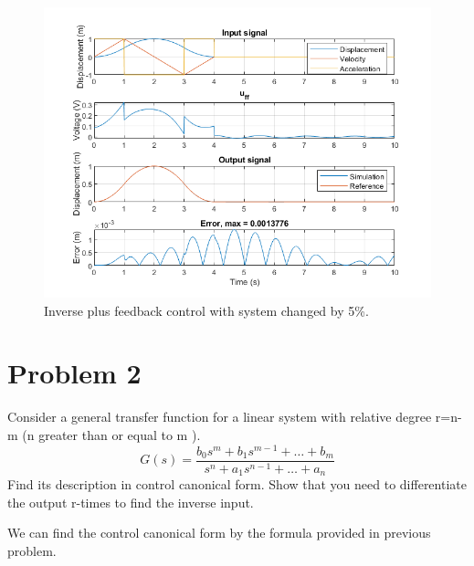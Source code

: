 \documentclass[12pt]{article}
\begin{document}
\begin{enumerate}[(a)]
    \begin{figure}[h]
      \includegraphics{p5_error_ff_fb.png}
      \centering
      \caption{Inverse plus feedback control with system changed by 5\%.}
    \end{figure}

  \end{enumerate}

  \clearpage

  \section{Problem 2}
  Consider a general transfer function for a linear system with relative degree r=n-m (n greater than or equal to m ).
  $$
  G(s) = \frac{b_0 s^m + b_1 s^{m-1} + \dots + b_m}{s^n + a_1 s^{n-1} + \dots + a_n}
  $$
  Find its description in control canonical form. Show that you need to differentiate the
  output r-times to find the inverse input.

  \hfill

  We can find the control canonical form by the formula provided in previous problem.
\end{document}
